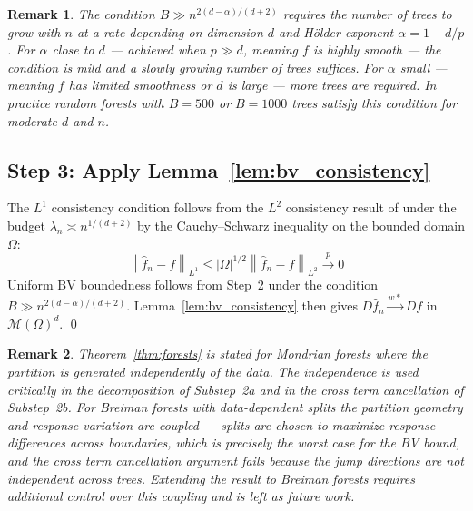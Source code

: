 \documentclass[12pt]{article}
\newtheorem{remark}{Remark}
\newcommand{\norm}[1]{\left\| #1 \right\|}
\newcommand{\cM}{\mathcal{M}(\Omega)^d}
\newcommand{\fn}{\hat{f}_n}
\newcommand{\xrightarrowp}{\xrightarrow{p}}
\begin{document}
	\begin{remark}
		The condition $B \gg n^{2(d-\alpha)/(d+2)}$ requires the number of trees
		to grow with $n$ at a rate depending on dimension $d$ and Hölder exponent
		$\alpha = 1 - d/p$. For $\alpha$ close to $d$ --- achieved when $p \gg d$,
		meaning $f$ is highly smooth --- the condition is mild and a slowly growing
		number of trees suffices. For $\alpha$ small --- meaning $f$ has limited
		smoothness or $d$ is large --- more trees are required. In practice random
		forests with $B = 500$ or $B = 1000$ trees satisfy this condition for
		moderate $d$ and $n$.
	\end{remark}
	
	\subsection{Step 3: Apply Lemma~\ref{lem:bv_consistency}}
	
	The $L^1$ consistency condition follows from the $L^2$ consistency result of
	\citet{mourtada2017mondrian} under the budget $\lambda_n \asymp n^{1/(d+2)}$
	by the Cauchy--Schwarz inequality on the bounded domain $\Omega$:
	\begin{equation}
		\norm{\fn - f}_{L^1}
		\leq |\Omega|^{1/2} \norm{\fn - f}_{L^2}
		\xrightarrowp 0
	\end{equation}
	Uniform BV boundedness follows from Step~2 under the condition
	$B \gg n^{2(d-\alpha)/(d+2)}$. Lemma~\ref{lem:bv_consistency} then gives
	$D\fn \xrightarrow{w*} Df$ in $\cM$. \qed
	
	\begin{remark}
		Theorem~\ref{thm:forests} is stated for Mondrian forests where the
		partition is generated independently of the data. The independence is
		used critically in the decomposition of Substep~2a and in the cross
		term cancellation of Substep~2b. For Breiman forests with data-dependent
		splits the partition geometry and response variation are coupled ---
		splits are chosen to maximize response differences across boundaries,
		which is precisely the worst case for the BV bound, and the cross term
		cancellation argument fails because the jump directions are not
		independent across trees. Extending the result to Breiman forests
		requires additional control over this coupling and is left as future
		work.
	\end{remark}
	
	
	
\end{document}
